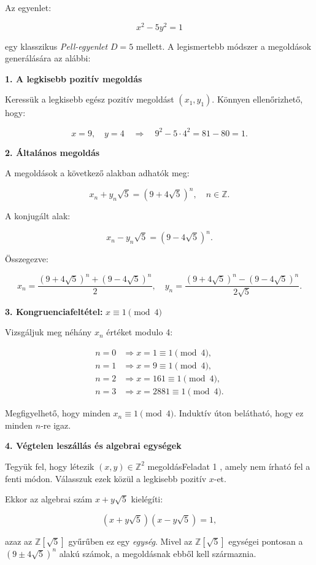 \begin{solution}
	Az egyenlet:
	
	\[
	x^{2}-5y^{2}=1
	\]
	
	egy klasszikus \emph{Pell-egyenlet} $D=5$ mellett. A legismertebb
	módszer a megoldások generálására az alábbi:
	
	\textbf{1. A legkisebb pozitív megoldás}
	
	Keressük a legkisebb egész pozitív megoldást $(x_{1},y_{1})$. Könnyen
	ellenőrizhető, hogy:
	
	\[
	x=9,\quad y=4\quad\Rightarrow\quad9^{2}-5\cdot4^{2}=81-80=1.
	\]
	
	\textbf{2. Általános megoldás}
	
	A megoldások a következő alakban adhatók meg:
	
	\[
	x_{n}+y_{n}\sqrt{5}=(9+4\sqrt{5})^{n},\quad n\in\mathbb{Z}.
	\]
	
	A konjugált alak:
	
	\[
	x_{n}-y_{n}\sqrt{5}=(9-4\sqrt{5})^{n}.
	\]
	
	Összegezve:
	
	\[
	x_{n}=\frac{(9+4\sqrt{5})^{n}+(9-4\sqrt{5})^{n}}{2},\quad y_{n}=\frac{(9+4\sqrt{5})^{n}-(9-4\sqrt{5})^{n}}{2\sqrt{5}}.
	\]
	
	\textbf{3. Kongruenciafeltétel:} $x\equiv1\pmod 4$
	
	Vizsgáljuk meg néhány $x_{n}$ értéket modulo 4:
	
	\begin{align*}
		n=0 & \Rightarrow x=1\equiv1\pmod 4,\\
		n=1 & \Rightarrow x=9\equiv1\pmod 4,\\
		n=2 & \Rightarrow x=161\equiv1\pmod 4,\\
		n=3 & \Rightarrow x=2881\equiv1\pmod 4.
	\end{align*}
	
	Megfigyelhető, hogy minden $x_{n}\equiv1\pmod 4$. Induktív úton belátható,
	hogy ez minden $n$-re igaz.
	
	\textbf{4. Végtelen leszállás és algebrai egységek}
	
	Tegyük fel, hogy létezik $(x,y)\in\mathbb{Z}^{2}$ megoldásFeladat
	1 , amely nem írható fel a fenti módon. Válasszuk ezek közül a legkisebb
	pozitív $x$-et.
	
	Ekkor az algebrai szám $x+y\sqrt{5}$ kielégíti:
	
	\[
	(x+y\sqrt{5})(x-y\sqrt{5})=1,
	\]
	
	azaz az $\mathbb{Z}[\sqrt{5}]$ gyűrűben ez egy \emph{egység}. Mivel
	az $\mathbb{Z}[\sqrt{5}]$ egységei pontosan a $(9\pm4\sqrt{5})^{n}$
	alakú számok, a megoldásnak ebből kell származnia.
	

\end{solution}
